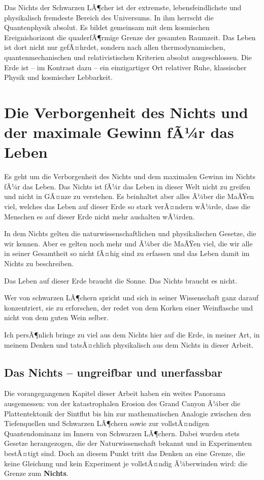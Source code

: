 ﻿\documentclass[12pt,a4paper]{report}
\begin{document}
Das Nichts der Schwarzen LÃ¶cher ist der extremste, lebensfeindlichste und
physikalisch fremdeste Bereich des Universums. In ihm herrscht die Quantenphysik absolut. Es bildet gemeinsam mit dem kosmischen Ereignishorizont die quaderfÃ¶rmige Grenze der gesamten Raumzeit. Das Leben ist dort nicht nur gefÃ¤hrdet, sondern nach allen thermodynamischen, quantenmechanischen und
relativistischen Kriterien absolut ausgeschlossen. Die Erde ist -- im Kontrast dazu -- ein einzigartiger Ort relativer Ruhe, klassischer Physik und kosmischer Lebbarkeit.

\chapter{Die Verborgenheit des Nichts und der maximale Gewinn fÃ¼r das Leben}
\label{sec:verborgenheit_nichts}

Es geht um die Verborgenheit des Nichts und dem maximalen Gewinn im Nichts fÃ¼r das Leben.
Das Nichts ist fÃ¼r das Leben in dieser Welt nicht zu greifen und nicht in GÃ¤nze zu verstehen.
Es beinhaltet aber alles Ã¼ber die MaÃŸen viel, welches das Leben auf dieser Erde so stark
verÃ¤ndern wÃ¼rde, dass die Menschen es auf dieser Erde nicht mehr aushalten wÃ¼rden.

In dem Nichts gelten die naturwissenschaftlichen und physikalischen Gesetze, die wir kennen.
Aber es gelten noch mehr und Ã¼ber die MaÃŸen viel, die wir alle in seiner Gesamtheit so nicht
fÃ¤hig sind zu erfassen und das Leben damit im Nichts zu beschreiben.

Das Leben auf dieser Erde braucht die Sonne. Das Nichts braucht es nicht.

Wer von schwarzen LÃ¶chern spricht und sich in seiner Wissenschaft ganz darauf konzentriert,
sie zu erforschen, der redet von dem Korken einer Weinflasche und nicht von dem guten Wein selber.

Ich persÃ¶nlich bringe zu viel aus dem Nichts hier auf die Erde, in meiner Art, in meinem Denken
und tatsÃ¤chlich physikalisch aus dem Nichts in dieser Arbeit.

\section{Das Nichts -- ungreifbar und unerfassbar}

Die vorangegangenen Kapitel dieser Arbeit haben ein weites Panorama ausgemessen: von der katastrophalen Erosion des Grand Canyon Ã¼ber die Plattentektonik der Sintflut bis hin zur mathematischen Analogie zwischen den Tiefenquellen und Schwarzen LÃ¶chern sowie zur vollstÃ¤ndigen Quantendominanz im Innern von Schwarzen LÃ¶chern. Dabei wurden stets Gesetze herangezogen, die der Naturwissenschaft bekannt und in Experimenten bestÃ¤tigt sind. Doch an diesem Punkt tritt das Denken an eine Grenze, die keine Gleichung und kein Experiment je vollstÃ¤ndig Ã¼berwinden wird: die Grenze zum \textbf{Nichts}.
\end{document}
